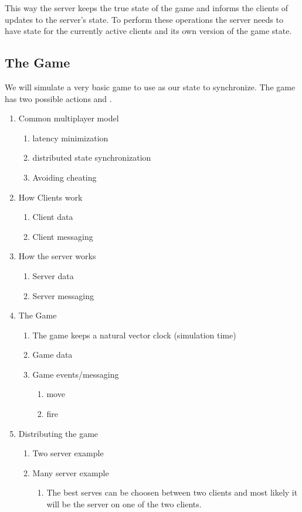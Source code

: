 	This way the server keeps the true state of the game and informs the clients of updates to the server's state. To perform these operations the server needs to have state for the currently active clients and its own version of the game state.

\subsection{The Game}

	We will simulate a very basic game to use as our state to synchronize. 
	The game has two possible actions \move{\agent}{\position} and \fire.
\begin{enumerate}
	\item Common multiplayer model
		\begin{enumerate}
		\item latency minimization
		\item distributed state synchronization
		\item Avoiding cheating
	\end{enumerate}
	\item How Clients work
	\begin{enumerate}
		\item Client data
		\item Client messaging
	\end{enumerate}

	\item How the server works
	\begin{enumerate}
		\item Server data
		\item Server messaging
	\end{enumerate}
	\item The Game
	\begin{enumerate}
		\item The game keeps a natural vector clock (simulation time)
		\item Game data
		\item Game events/messaging
		\begin{enumerate}
			\item move
			\item fire
		\end{enumerate}
	\end{enumerate}
	\item Distributing the game
	\begin{enumerate}
		\item {Two server example}
		\item {Many server example}
		\begin{enumerate}
			\item The best serves can be choosen between two clients and most likely it will be the server on one of the two clients.
		\end{enumerate}
	\end{enumerate}
\end{enumerate}


